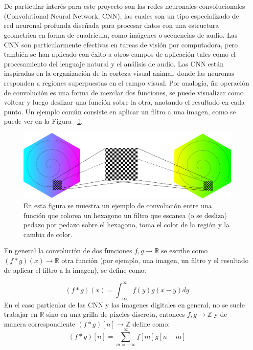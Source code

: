 \documentclass[12pt,letterpaper,final, openany]{scrbook}
\begin{document}
\\
\\
De particular interés para este proyecto son las redes neuronales convolucionales (Convolutional Neural Network, CNN), las cuales son un tipo especializado de red neuronal profunda diseñada para procesar datos con una estructura geometrica en forma de cuadrícula, como imágenes o secuencias de audio. Las CNN son particularmente efectivas en tareas de visión por computadora, pero también se han aplicado con éxito a otros campos de aplicación tales como el procesamiento del lenguaje natural y el análisis de audio. Las CNN están inspiradas en la organización de la corteza visual animal, donde las neuronas responden a regiones superpuestas en el campo visual. Por analogía, ña operación de convolución es una forma de mezclar dos funciones, se puede visualizar como voltear y luego deslizar una función sobre la otra, anotando el resultado en cada punto. Un ejemplo común consiste en aplicar un filtro a una imagen, como se puede ver en la Figura ~\ref{fig:convolution}.
\\
\begin{figure}[h!]
\includegraphics[width=1\textwidth]{convolution.png}
\caption{En esta figura se muestra un ejemplo de convolución entre una función que colorea un hexagono un filtro que escanea (o se desliza) pedazo por pedazo sobre el hexagono, toma el color de la región y la cambia de color.}
\label{fig:convolution}
\end{figure}


En general la convolución de dos funciones $f,g \rightarrow \mathbb{R}$ se escribe como $(f*g)(x) \rightarrow \mathbb{R}$ otra función (por ejemplo, una imagen, un filtro y el resultado de aplicar el filtro a la imagen),  se define como:

\begin{equation}
(f * g)(x) = \int_{-\infty}^{\infty} f(y)g(x-y)dy
\end{equation}
En el caso particular de las CNN y las imagenes digitales en general, no se suele trabajar en $\mathbb{R}$ sino en una grilla de pixeles discreta, entonces $f,g \rightarrow \mathbb{Z}$ y de manera correspondiente $(f*g)[n] \rightarrow \mathbb{Z}$ define como:
\begin{equation}
(f * g)[n] = \sum_{m=-\infty}^{\infty} f[m]g[n-m]
\end{equation}
\end{document}
